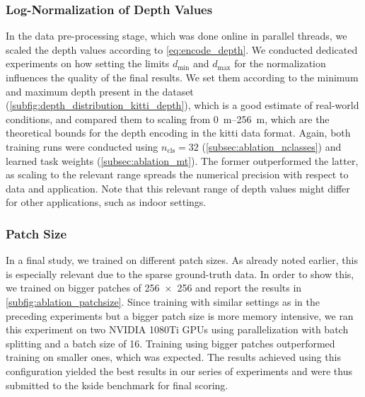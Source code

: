 \documentclass[lang=english]{tumarxivarticle}
\begin{document}
\subsubsection{Log-Normalization of Depth Values}
\label{subsec:ablation_scaling}

In the data pre-processing stage, which was done online in parallel threads, we scaled the depth values according to \cref{eq:encode_depth}.
We conducted dedicated experiments on how setting the limits $d_\text{min}$ and $d_\text{max}$ for the normalization influences the quality of the final results.
We set them according to the minimum and maximum depth present in the dataset (\cf \cref{subfig:depth_distribution_kitti_depth}), which is a good estimate of real-world conditions, and compared them to scaling from \SIrange{0}{256}{\meter}, which are the theoretical bounds for the depth encoding in the \gls{kitti} data format.
Again, both training runs were conducted using $n_\text{cls} = 32$ (\cf \cref{subsec:ablation_nclasses}) and learned task weights (\cf \cref{subsec:ablation_mt}).
The former outperformed the latter, as scaling to the relevant range spreads the numerical precision with respect to data and application.
Note that this relevant range of depth values might differ for other applications, such as indoor settings.

\subsubsection{Patch Size}
\label{subsec:ablation_patchsize}

In a final study, we trained on different patch sizes.
As already noted earlier, this is especially relevant due to the sparse ground-truth data.
In order to show this, we trained on bigger patches of \SI{256x256}{\pixel} and report the results in \cref{subfig:ablation_patchsize}.
Since training with similar settings as in the preceding experiments but a bigger patch size is more memory intensive, we ran this experiment on two NVIDIA 1080Ti GPUs using parallelization with batch splitting and a batch size of \num{16}.
Training using bigger patches outperformed training on smaller ones, which was expected.
The results achieved using this configuration yielded the best results in our series of experiments and were thus submitted to the \gls{kside} benchmark for final scoring.
\end{document}
